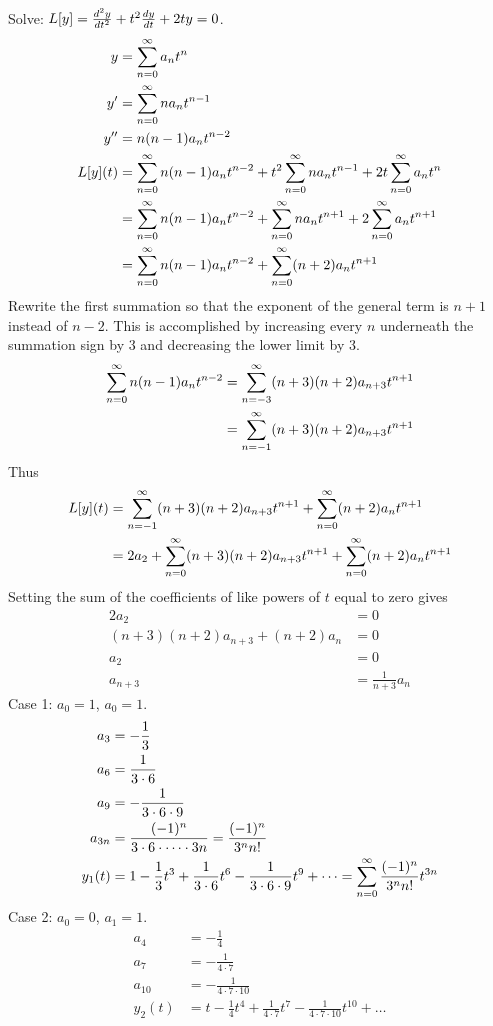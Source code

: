 \documentclass[12pt]{article}
\begin{document}
\begin{example} Solve: $L[y] = \frac{d^2y}{dt^2} + t^2\frac{dy}{dt} + 2ty = 0$. $$\begin{aligned} y &= \sum_{n = 0}^{\infty} a_nt^n \\ y' &= \sum_{n = 0}^{\infty} na_nt^{n - 1} \\ y'' &= n(n -1)a_nt^{n - 2} \\ L[y](t) &= \sum_{n = 0}^{\infty} n(n - 1)a_nt^{n - 2} + t^2 \sum_{n = 0}^{\infty} na_nt^{n - 1} + 2t\sum_{n = 0}^{\infty} a_nt^n \\ &= \sum_{n = 0}^{\infty} n(n - 1)a_nt^{n - 2} + \sum_{n = 0}^{\infty} na_nt^{n + 1} + 2\sum_{n = 0}^{\infty} a_nt^{n + 1} \\ &= \sum_{n = 0}^{\infty} n(n - 1)a_nt^{n - 2} + \sum_{n = 0}^{\infty} (n + 2)a_nt^{n + 1} \end{aligned} $$ Rewrite the first summation so that the exponent of the general term is $n + 1$ instead of $n - 2$. This is accomplished by increasing every $n$ underneath the summation sign by 3 and decreasing the lower limit by 3. $$\begin{aligned} \sum_{n = 0}^{\infty} n(n - 1)a_nt^{n - 2} &= \sum_{n = -3}^{\infty} (n + 3)(n + 2)a_{n + 3}t^{n + 1} \\ &= \sum_{n = -1}^{\infty} (n + 3)(n + 2)a_{n + 3}t^{n + 1} \end{aligned} $$ Thus $$\begin{aligned} L[y](t) &= \sum_{n = -1}^{\infty} (n + 3)(n + 2)a_{n + 3}t^{n + 1} + \sum_{n = 0}^{\infty} (n + 2)a_nt^{n + 1} \\ &= 2a_2 + \sum_{n = 0}^{\infty} (n + 3)(n + 2)a_{n + 3}t^{n + 1} + \sum_{n = 0}^{\infty} (n + 2)a_nt^{n + 1} \end{aligned} $$ Setting the sum of the coefficients of like powers of $t$ equal to zero gives $$ \begin{aligned} 2a_2 &= 0 \\ (n + 3)(n + 2)a_{n + 3} + (n + 2)a_n &= 0 \\ a_2 &= 0 \\ a_{n + 3} &= \frac{1}{n + 3}a_n \end{aligned} $$ 
Case 1: $a_0 = 1$, $a_0 = 1$. $$\begin{aligned} a_3 &= -\frac{1}{3} \\ a_6 &= \frac{1}{3 \cdot 6} \\ a_9 &= -\frac{1}{3 \cdot 6 \cdot 9} \\ a_{3n} &= \frac{(-1)^n}{3 \cdot 6 \cdot \dots \cdot 3n} = \frac{(-1)^n}{3^nn!} \\ y_1(t) &= 1 - \frac{1}{3}t^3 + \frac{1}{3 \cdot 6}t^6 - \frac{1}{3 \cdot 6 \cdot 9}t^9 + \dots = \sum_{n = 0}^{\infty} \frac{(-1)^n}{3^nn!}t^{3n} \end{aligned} $$ 
Case 2: $a_0 = 0$, $a_1 = 1$. $$\begin{aligned} a_4 &= -\frac{1}{4} \\ a_7 &= -\frac{1}{4 \cdot 7}  \\ a_{10} &= -\frac{1}{4 \cdot 7 \cdot 10} \\ y_2(t) &= t - \frac{1}{4}t^4 + \frac{1}{4 \cdot 7}t^7 - \frac{1}{4 \cdot 7 \cdot 10}t^{10} + \dots \end{aligned} $$ \end{example} 
\end{document}
